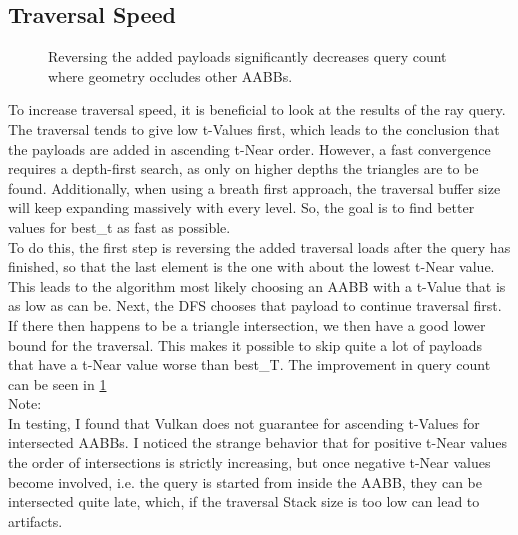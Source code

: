 \subsection{Traversal Speed}
\label{sec:OptTraversalSpeed}
\begin{figure}[b]
\hfill
{}
\hfill
{}
\hfill
{}
\hfill
\caption{Reversing the added payloads significantly decreases query count where geometry occludes other AABBs.}
\hfill
\label{fig:TraversalSpeedQueryCount}
\end{figure}
To increase traversal speed, it is beneficial to look at the results of the ray query. The traversal tends to give low t-Values first, which leads to the conclusion that the payloads are added in ascending t-Near order. However, a fast convergence requires a depth-first search, as only on higher depths the triangles are to be found. Additionally, when using a breath first approach, the traversal buffer size will keep expanding massively with every level. So, the goal is to find better values for best\_t as fast as possible.\\
To do this, the first step is reversing the added traversal loads after the query has finished, so that the last element is the one with about the lowest t-Near value. This leads to the algorithm most likely choosing an AABB with a t-Value that is as low as can be. Next, the DFS chooses that payload to continue traversal first. If there then happens to be a triangle intersection, we then have a good lower bound for the traversal. This makes it possible to skip quite a lot of payloads that have a t-Near value worse than best\_T. The improvement in query count can be seen in \ref{fig:TraversalSpeedQueryCount}\\
Note:\\
In testing, I found that Vulkan does not guarantee for ascending t-Values for intersected AABBs. I noticed the strange behavior that for positive t-Near values the order of intersections is strictly increasing, but once negative t-Near values become involved, i.e. the query is started from inside the AABB, they can be intersected quite late, which, if the traversal Stack size is too low can lead to artifacts.

